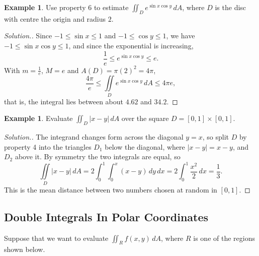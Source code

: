 \documentclass[11pt,a4paper]{article}
\theoremstyle{definition}
\newtheorem{exa}[thm]{Example}
\newenvironment{solution}
  {\renewcommand{\qedsymbol}{}\begin{proof}[\textit{Solution}.]}
  {\end{proof}}
\begin{document}
\begin{exa}
\label{ex:estimate}
Use property 6 to estimate $\iint_D e^{\sin x \cos y}\, dA$, where $D$ is the
disc with centre the origin and radius $2$.
\end{exa}

\begin{solution}
Since $-1 \leq \sin x \leq 1$ and $-1 \leq \cos y\leq 1$, we have
$-1 \leq \sin x \cos y\leq 1$, and since the exponential is increasing,
\[\frac{1}{e} \leq e^{\sin x \cos y} \leq e .\]
With $m = \frac{1}{e}$, $M = e$ and $A(D) = \pi (2)^2 = 4\pi$,
\[\frac{4\pi}{e}\leq \iint\limits_D e^{\sin x \cos y}\, dA \leq 4\pi e ,\]
that is, the integral lies between about $4.62$ and $34.2$.
\end{solution}

\begin{exa}
\label{ex:splitregion}
Evaluate $\iint_D |x - y|\,dA$ over the square $D = [0,1]\times[0,1]$.
\end{exa}

\begin{solution}
The integrand changes form across the diagonal $y = x$, so split $D$ by
property 4 into the triangles $D_1$ below the diagonal, where $|x - y| = x - y$,
and $D_2$ above it. By symmetry the two integrals are equal, so
\[\iint\limits_D |x - y|\,dA = 2\int_0^1\int_0^x (x - y)\,dy\,dx =
2\int_0^1\frac{x^2}{2}\,dx = \frac13 .\]
This is the mean distance between two numbers chosen at random in $[0,1]$.
\end{solution}


{\color[wave]{485}\subsection{Double Integrals In Polar Coordinates}}

Suppose that we want to evaluate $\iint_R f(x,y)\,dA$, where $R$ is one of the
regions shown below.

\begin{figure}[H]
\centering
{}
\end{figure}
\end{document}
